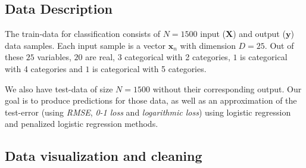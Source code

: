 \documentclass{article} %
\begin{document}
\subsection{Data Description}

The train-data for classification consists of $N = 1500$ input ($\mathbf{X}$) and output ($\mathbf{y}$) data samples. Each input sample is a vector $\mathbf{x}_n$ with dimension $D = 25$. Out of these $25$ variables, $20$ are real, $3$ categorical with 2 categories, $1$ is categorical with 4 categories and $1$ is categorical with 5 categories.

We also have test-data of size $N=1500$ without their corresponding output. Our goal is to produce predictions for those data, as well as an approximation of the test-error (using \textit{RMSE}, \textit{0-1 loss} and \textit{logarithmic loss}) using logistic regression and penalized logistic regression methods.

\subsection{Data visualization and cleaning}
\begin{figure}
\center
{}
\hfill
{}
\caption{}
\end{figure}
\end{document}
